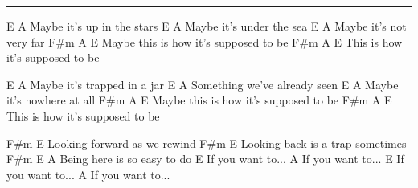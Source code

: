 \noindent\rule{\columnwidth}{1pt}

\begin{multicols}{2}
\begin{lstsong}
E                    A
Maybe it's up in the stars
E                    A
Maybe it's under the sea
E                   A
Maybe it's not very far
      F#m                A         E
Maybe this is how it's supposed to be
F#m                A         E
This is how it's supposed to be


E                       A
Maybe it's trapped in a jar
E                       A
Something we've already seen
E                     A
Maybe it's nowhere at all
      F#m                A         E
Maybe this is how it's supposed to be
F#m                A        E
This is how it's supposed to be








F#m              E       
Looking forward as we rewind
F#m               E
Looking back is a trap sometimes
F#m               E      A
Being here is so easy to do
E
If you want to...
A
If you want to...
E
If you want to...
A
If you want to...
\end{lstsong}
\end{multicols}
\newpage

